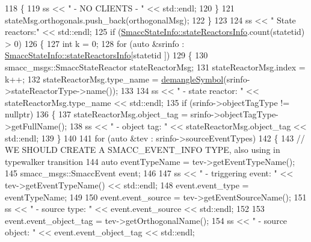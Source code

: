 \begin{DoxyCode}
118             \{
119                 ss << \textcolor{stringliteral}{"          - NO CLIENTS - "} << std::endl;
120             \}
121             stateMsg.orthogonals.push\_back(orthogonalMsg);
122         \}
123 
124         ss << \textcolor{stringliteral}{" State reactors:"} << std::endl;
125         \textcolor{keywordflow}{if} (\hyperlink{classsmacc_1_1introspection_1_1SmaccStateInfo_abd1d6ca5060c87f6bd11fde3e5b2ac4d}{SmaccStateInfo::stateReactorsInfo}.count(statetid) > 0)
126         \{
127             \textcolor{keywordtype}{int} k = 0;
128             \textcolor{keywordflow}{for} (\textcolor{keyword}{auto} &srinfo : \hyperlink{classsmacc_1_1introspection_1_1SmaccStateInfo_abd1d6ca5060c87f6bd11fde3e5b2ac4d}{SmaccStateInfo::stateReactorsInfo}[statetid
      ])
129             \{
130                 smacc\_msgs::SmaccStateReactor stateReactorMsg;
131                 stateReactorMsg.index = k++;
132                 stateReactorMsg.type\_name = \hyperlink{namespacesmacc_1_1introspection_a2f495108db3e57604d8d3ff5ef030302}{demangleSymbol}(srinfo->stateReactorType->name());
133 
134                 ss << \textcolor{stringliteral}{" - state reactor: "} << stateReactorMsg.type\_name << std::endl;
135                 \textcolor{keywordflow}{if} (srinfo->objectTagType != \textcolor{keyword}{nullptr})
136                 \{
137                     stateReactorMsg.object\_tag = srinfo->objectTagType->getFullName();
138                     ss << \textcolor{stringliteral}{"        - object tag: "} << stateReactorMsg.object\_tag << std::endl;
139                 \}
140 
141                 \textcolor{keywordflow}{for} (\textcolor{keyword}{auto} &tev : srinfo->sourceEventTypes)
142                 \{
143                     \textcolor{comment}{// WE SHOULD CREATE A SMACC\_EVENT\_INFO TYPE, also using in typewalker transition}
144                     \textcolor{keyword}{auto} eventTypeName = tev->getEventTypeName();
145                     smacc\_msgs::SmaccEvent event;
146 
147                     ss << \textcolor{stringliteral}{"             - triggering event: "} << tev->getEventTypeName() << std::endl;
148                     \textcolor{keyword}{event}.event\_type = eventTypeName;
149 
150                     \textcolor{keyword}{event}.event\_source = tev->getEventSourceName();
151                     ss << \textcolor{stringliteral}{"                 - source type: "} << \textcolor{keyword}{event}.event\_source << std::endl;
152 
153                     \textcolor{keyword}{event}.event\_object\_tag = tev->getOrthogonalName();
154                     ss << \textcolor{stringliteral}{"                 - source object: "} << \textcolor{keyword}{event}.event\_object\_tag << std::endl;

\end{DoxyCode}

